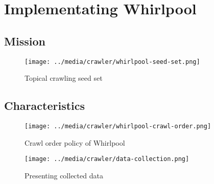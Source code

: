 \chapter{Implementating Whirlpool}\label{implwhirlpool}
\section{Mission}\label{mission}
\begin{figure}[h!]
  \centering
  \texttt{[image: ../media/crawler/whirlpool-seed-set.png]}
  \caption{Topical crawling seed set}
  \label{fig:seedset}
\end{figure}
\section{Characteristics}
\begin{figure}[h!]
  \centering
  \texttt{[image: ../media/crawler/whirlpool-crawl-order.png]}
  \caption{Crawl order policy of Whirlpool}
  \label{fig:whrlplcrawlorder}
\end{figure}

\begin{figure}[h!]
  \centering
  \texttt{[image: ../media/crawler/data-collection.png]}
  \caption{Presenting collected data}
  \label{fig:datacollect}
\end{figure}

\pagebreak